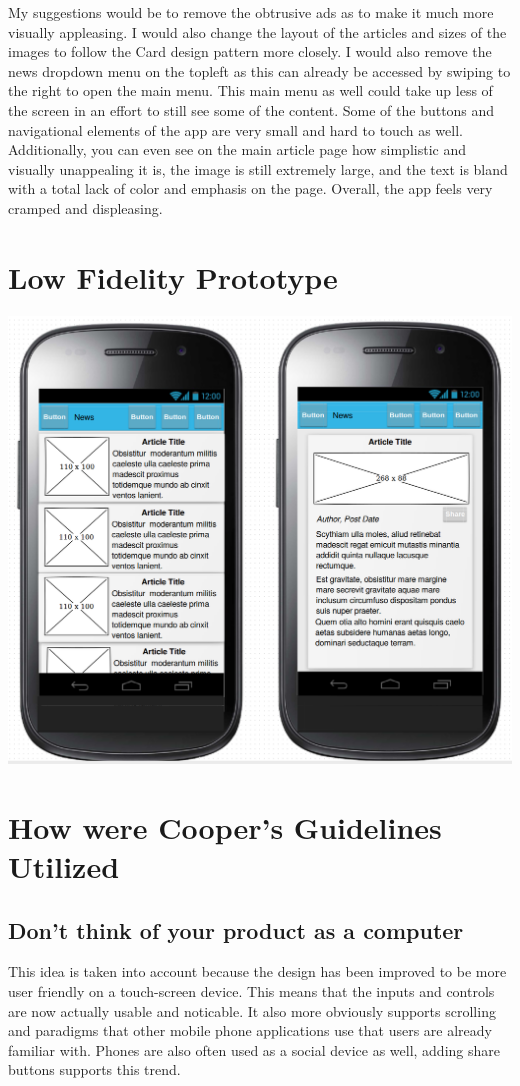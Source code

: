 \documentclass[a4paper, 11pt]{article}
\begin{document}
My suggestions would be to remove the obtrusive ads as to make it much more visually appleasing.  I would also change the layout of the articles and sizes of the images to follow the Card design pattern more closely.  I would also remove the news dropdown menu on the topleft as this can already be accessed by swiping to the right to open the main menu.  This main menu as well could take up less of the screen in an effort to still see some of the content.  Some of the buttons and navigational elements of the app are very small and hard to touch as well.  Additionally, you can even see on the main article page how simplistic and visually unappealing it is, the image is still extremely large, and the text is bland with a total lack of color and emphasis on the page.  Overall, the app feels very cramped and displeasing.

\section*{Low Fidelity Prototype}
\includegraphics[scale=0.25]{lowfi.png}

\section*{How were Cooper's Guidelines Utilized}
\subsection*{Don't think of your product as a computer}
This idea is taken into account because the design has been improved to be more user friendly on a touch-screen device.  This means that the inputs and controls are now actually usable and noticable.  It also more obviously supports scrolling and paradigms that other mobile phone applications use that users are already familiar with.  Phones are also often used as a social device as well, adding share buttons supports this trend.
\end{document}
